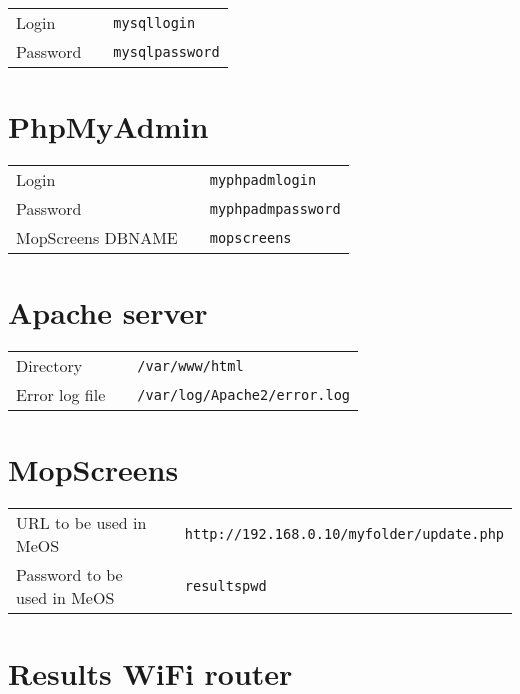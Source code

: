\documentclass[a4paper]{ffco-rapport}
\begin{document}
\begin{tabular}{lp{6cm}l}
	Login & \hrulefill &\color{gray}\footnotesize\texttt{mysqllogin}\\
	Password & \hrulefill &\color{gray}\footnotesize\texttt{mysqlpassword}\\
\end{tabular}


\section*{PhpMyAdmin}

\begin{tabular}{lp{6cm}l}
	Login & \hrulefill &\color{gray}\footnotesize\texttt{myphpadmlogin}\\
	Password & \hrulefill &\color{gray}\footnotesize\texttt{myphpadmpassword}\\
	MopScreens DBNAME & \hrulefill &\color{gray}\footnotesize\texttt{mopscreens}\\
\end{tabular}

\section*{Apache server}

\begin{tabular}{lp{6cm}l}
	Directory & \hrulefill &\color{gray}\footnotesize\texttt{/var/www/html}\\
	Error log file & \hrulefill &\color{gray}\footnotesize\texttt{/var/log/Apache2/error.log}\\
\end{tabular}

\section*{MopScreens}

\begin{tabular}{lp{6cm}l}
	URL to be used in MeOS & \hrulefill &\color{gray}\footnotesize\texttt{http://192.168.0.10/myfolder/update.php}\\
	Password to be used in MeOS & \hrulefill &\color{gray}\footnotesize\texttt{resultspwd}\\
\end{tabular}

\section*{Results WiFi router}
\end{document}

